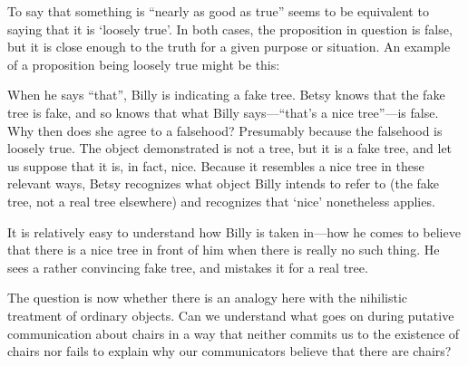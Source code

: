 \documentclass[11pt]{article}
\begin{document}
\begin{spacing}{1.25}
To say that something is ``nearly as good as true'' seems to be
equivalent to saying that it is `loosely true'.  In both cases, the
proposition in question is false, but it is close enough to the truth
for a given purpose or situation.  An example of a proposition being
loosely true might be this:






When he says ``that'', Billy is indicating a fake tree.  Betsy knows
that the fake tree is fake, and so knows that what Billy
says---``that's a nice tree''---is false.  Why then does she agree to
a falsehood?  Presumably because the falsehood is loosely true.  The
object demonstrated is not a tree, but it is a fake tree, and let us
suppose that it is, in fact, nice.  Because it resembles a nice tree
in these relevant ways, Betsy recognizes what object Billy intends to
refer to (the fake tree, not a real tree elsewhere) and recognizes
that `nice' nonetheless applies.

It is relatively easy to understand how Billy is taken in---how he
comes to believe that there is a nice tree in front of him when there
is really no such thing.  He sees a rather convincing fake tree, and
mistakes it for a real tree.

The question is now whether there is an analogy here with the
nihilistic treatment of ordinary objects.  Can we understand what goes
on during putative communication about chairs in a way that neither
commits us to the existence of chairs nor fails to explain why our
communicators believe that there are chairs?






\end{spacing}
\end{document}
